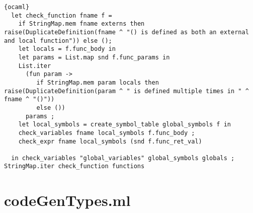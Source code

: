 \begin{lstlisting}{ocaml}
  let check_function fname f =
    if StringMap.mem fname externs then raise(DuplicateDefinition(fname ^ "() is defined as both an external and local function")) else ();
    let locals = f.func_body in
    let params = List.map snd f.func_params in
    List.iter
      (fun param ->
         if StringMap.mem param locals then raise(DuplicateDefinition(param ^ " is defined multiple times in " ^ fname ^ "()"))
         else ())
      params ;
    let local_symbols = create_symbol_table global_symbols f in
    check_variables fname local_symbols f.func_body ;
    check_expr fname local_symbols (snd f.func_ret_val)

  in check_variables "global_variables" global_symbols globals ; StringMap.iter check_function functions
\end{lstlisting}
\section{codeGenTypes.ml}
